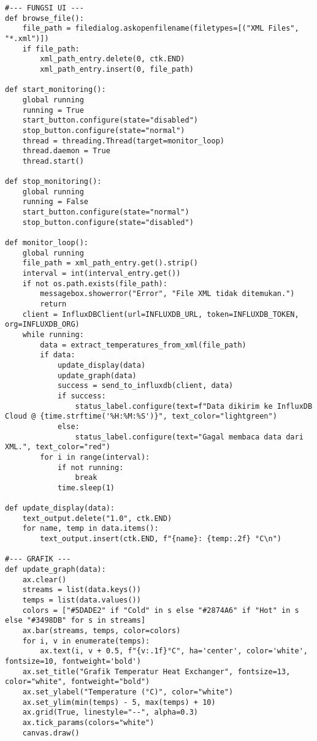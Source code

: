 \documentclass[a4paper, 12pt]{article}
\begin{document}
\begin{lstlisting}[style=pythonstyle, caption={DWSIM (python)}]
#--- FUNGSI UI ---
def browse_file():
    file_path = filedialog.askopenfilename(filetypes=[("XML Files", "*.xml")])
    if file_path:
        xml_path_entry.delete(0, ctk.END)
        xml_path_entry.insert(0, file_path)

def start_monitoring():
    global running
    running = True
    start_button.configure(state="disabled")
    stop_button.configure(state="normal")
    thread = threading.Thread(target=monitor_loop)
    thread.daemon = True
    thread.start()

def stop_monitoring():
    global running
    running = False
    start_button.configure(state="normal")
    stop_button.configure(state="disabled")

def monitor_loop():
    global running
    file_path = xml_path_entry.get().strip()
    interval = int(interval_entry.get())
    if not os.path.exists(file_path):
        messagebox.showerror("Error", "File XML tidak ditemukan.")
        return
    client = InfluxDBClient(url=INFLUXDB_URL, token=INFLUXDB_TOKEN, org=INFLUXDB_ORG)
    while running:
        data = extract_temperatures_from_xml(file_path)
        if data:
            update_display(data)
            update_graph(data)
            success = send_to_influxdb(client, data)
            if success:
                status_label.configure(text=f"Data dikirim ke InfluxDB Cloud @ {time.strftime('%H:%M:%S')}", text_color="lightgreen")
            else:
                status_label.configure(text="Gagal membaca data dari XML.", text_color="red")
        for i in range(interval):
            if not running:
                break
            time.sleep(1)

def update_display(data):
    text_output.delete("1.0", ctk.END)
    for name, temp in data.items():
        text_output.insert(ctk.END, f"{name}: {temp:.2f} °C\n")

#--- GRAFIK ---
def update_graph(data):
    ax.clear()
    streams = list(data.keys())
    temps = list(data.values())
    colors = ["#5DADE2" if "Cold" in s else "#2874A6" if "Hot" in s else "#3498DB" for s in streams]
    ax.bar(streams, temps, color=colors)
    for i, v in enumerate(temps):
        ax.text(i, v + 0.5, f"{v:.1f}°C", ha='center', color='white', fontsize=10, fontweight='bold')
    ax.set_title("Grafik Temperatur Heat Exchanger", fontsize=13, color="white", fontweight="bold")
    ax.set_ylabel("Temperature (°C)", color="white")
    ax.set_ylim(min(temps) - 5, max(temps) + 10)
    ax.grid(True, linestyle="--", alpha=0.3)
    ax.tick_params(colors="white")
    canvas.draw()


\end{lstlisting}
\end{document}
